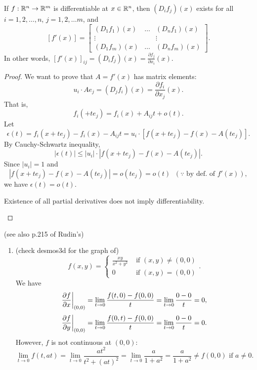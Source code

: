 \begin{thm}[17]
	If $f:\mathbb{R}^{n}\to \mathbb{R}^{m}$ is differentiable at $x \in \mathbb{R}^{n}$, then
	$(D_i f_j)(x)$ exists for all $i=1,2,\ldots ,n$, $j=1,2,\ldots m$, and
	\[
		\left[f'(x)\right]=\left[\begin{array}{ccc}
				(D_1 f_1)(x) & \ldots & (D_n f_1)(x) \\
				\vdots       &        & \vdots       \\
				(D_1 f_m)(x) & \ldots & (D_n f_m)(x)
			\end{array}\right]
		.\]
	In other words, $\left[f'(x)\right]_{ij}=(D_i f_j)(x)=\frac{\partial f_j}{\partial x_i}(x)$.
\end{thm}
\begin{proof}
	We want to prove that $A=f'(x)$ has matrix elements:
	\[
		u_{i}\cdot A e_{j}=(D_{j}f_{i})(x)=\frac{\partial f_{i}}{\partial x_{j}}(x)
		.\]
	That is, \[
		f_i(+te_j)=f_i(x) + A_{ij}t + o(t)
		.\]
	Let
	\[
		\epsilon(t)=f_i(x+te_j)-f_i(x)-A_{ij}t=u_i \cdot \left[f(x+te_j)-f(x)-A(te_j)\right]
		.\]
	By Cauchy-Schwartz inequality,
	\[
		\left|\epsilon(t)\right|\le \left|u_i\right|\cdot \left|f(x+te_j)-f(x)-A(te_j)\right|
		.\]
	Since $\left|u_i\right|=1$ and
	\[
		\left|f(x+te_j)-f(x)-A(te_j)\right|=o(te_j)=o(t) \;\;(\because \text{ by def. of } f'(x))
		,\]
	we have $\epsilon(t)=o(t)$.
	\begin{note}
		Existence of all partial derivatives does not imply differentiability.
	\end{note}
\end{proof}
\begin{example}
	(see also p.215 of Rudin's)\\
	\begin{enumerate}
		\item
		      (check desmos3d for the graph of)
		      \[
			      f(x,y)=
			      \begin{cases}
				      \frac{xy}{x^2+y^2} & \text{ if } (x,y)\neq (0,0) \\
				      0                  & \text{ if } (x,y)=(0,0)
			      \end{cases}
			      .\]
		      We have
		      \[
			      \frac{\partial f}{\partial x}\bigg{\rvert}_{(0,0)}=\lim_{t\to 0}{\frac{f(t,0)-f(0,0)}{t}}=\lim_{t\to 0}{\frac{0-0}{t}}=0
			      ,\]
		      \[
			      \frac{\partial f}{\partial y}\bigg{\rvert}_{(0,0)}=\lim_{t\to 0}{\frac{f(0,t)-f(0,0)}{t}}=\lim_{t\to 0}{\frac{0-0}{t}}=0
			      .\]
		      However, $f$ is not continuous at $(0,0)$:
		      \[
			      \lim_{t\to 0}{f(t,at)}=\lim_{t\to 0}{\frac{at^2}{t^2+(at)^2}}=\lim_{t\to 0}{\frac{a}{1+a^2}}=\frac{a}{1+a^2}\neq f(0,0) \text{ if } a\neq 0
			      .\]
	\end{enumerate}
\end{example}


